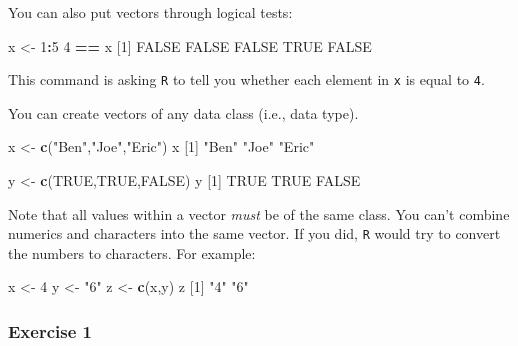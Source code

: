\documentclass[
]{book}
\newenvironment{Shaded}{\begin{snugshade}}{\end{snugshade}}
\newcommand{\DecValTok}[1]{\textcolor[rgb]{0.00,0.00,0.81}{#1}}
\newcommand{\KeywordTok}[1]{\textcolor[rgb]{0.13,0.29,0.53}{\textbf{#1}}}
\newcommand{\NormalTok}[1]{#1}
\newcommand{\OperatorTok}[1]{\textcolor[rgb]{0.81,0.36,0.00}{\textbf{#1}}}
\newcommand{\OtherTok}[1]{\textcolor[rgb]{0.56,0.35,0.01}{#1}}
\newcommand{\StringTok}[1]{\textcolor[rgb]{0.31,0.60,0.02}{#1}}
\begin{document}
You can also put vectors through logical tests:

\begin{Shaded}
\begin{Highlighting}[]
\NormalTok{x <-}\StringTok{ }\DecValTok{1}\OperatorTok{:}\DecValTok{5}
\DecValTok{4} \OperatorTok{==}\StringTok{ }\NormalTok{x}
\NormalTok{[}\DecValTok{1}\NormalTok{] }\OtherTok{FALSE} \OtherTok{FALSE} \OtherTok{FALSE}  \OtherTok{TRUE} \OtherTok{FALSE}
\end{Highlighting}
\end{Shaded}

This command is asking \texttt{R} to tell you whether each element in \texttt{x} is equal to \texttt{4}.

You can create vectors of any data class (i.e., data type).

\begin{Shaded}
\begin{Highlighting}[]
\NormalTok{x <-}\StringTok{ }\KeywordTok{c}\NormalTok{(}\StringTok{"Ben"}\NormalTok{,}\StringTok{"Joe"}\NormalTok{,}\StringTok{"Eric"}\NormalTok{) }
\NormalTok{x}
\NormalTok{[}\DecValTok{1}\NormalTok{] }\StringTok{"Ben"}  \StringTok{"Joe"}  \StringTok{"Eric"}

\NormalTok{y <-}\StringTok{ }\KeywordTok{c}\NormalTok{(}\OtherTok{TRUE}\NormalTok{,}\OtherTok{TRUE}\NormalTok{,}\OtherTok{FALSE}\NormalTok{)}
\NormalTok{y}
\NormalTok{[}\DecValTok{1}\NormalTok{]  }\OtherTok{TRUE}  \OtherTok{TRUE} \OtherTok{FALSE}
\end{Highlighting}
\end{Shaded}

Note that all values within a vector \emph{must} be of the same class. You can't combine numerics and characters into the same vector. If you did, \texttt{R} would try to convert the numbers to characters. For example:

\begin{Shaded}
\begin{Highlighting}[]
\NormalTok{x <-}\StringTok{ }\DecValTok{4}
\NormalTok{y <-}\StringTok{ "6"}
\NormalTok{z <-}\StringTok{ }\KeywordTok{c}\NormalTok{(x,y)}
\NormalTok{z}
\NormalTok{[}\DecValTok{1}\NormalTok{] }\StringTok{"4"} \StringTok{"6"}
\end{Highlighting}
\end{Shaded}

\hypertarget{exercise-1-3}{%
\subsubsection*{Exercise 1}\label{exercise-1-3}}
\end{document}
